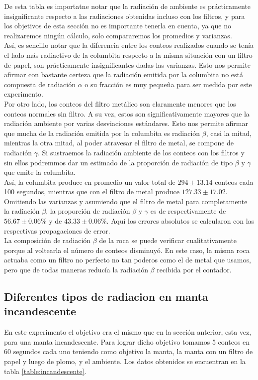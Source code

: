 \documentclass[%
 reprint,
 amsmath,amssymb,
 aps,
]{revtex4-1}
\begin{document}
De esta tabla es importatne notar que la radiación de ambiente es prácticamente insignificante respecto a las radiaciones obtenidas incluso con los filtros, y para los objetivos de esta sección no es importante tenerla en cuenta, ya que no realizaremos ningún cálculo, solo compararemos los promedios y varianzas.\\

Así, es sencillo notar que la diferencia entre los conteos realizados cuando se tenía el lado más radiactivo de la columbita respecto a la misma situación con un filtro de papel, son prácticamente insignificantes dadas las varianzas. Esto nos permite afirmar con bastante certeza que la radiación emitida por la columbita no está compuesta de radiación $\alpha$ o su fracción es muy pequeña para ser medida por este experimento. \\

Por otro lado, los conteos del filtro metálico son claramente menores que los conteos normales sin filtro. A su vez, estos son significativamente mayores que la radiación ambiente por varias desviaciones estándares. Esto nos permite afirmar que mucha de la radiación emitida por la columbita es radiación $\beta$, casi la mitad, mientras la otra mitad, al poder atravesar el filtro de metal, se compone de radiación $\gamma$. Si sustraemos la radiación ambiente de los conteos con los filtros y sin ellos podremmos dar un estimado de la proporción de radiación de tipo $\beta$ y $\gamma$ que emite la columbita.\\

Así, la columbita produce en promedio un valor total de $294 \pm 13.14$ conteos cada 100 segundos, mientras que con el filtro de metal produce $127.33 \pm 17.02$. Omitiendo las varianzas y asumiendo que el filtro de metal para completamente la radiación $\beta$, la proporción de radiación $\beta$ y $\gamma$ es de respectivamente de $56.67 \pm 0.06\%$  y de $43.33 \pm 0.06\%$. Aquí los errores absolutos se calcularon con las respectivas propagaciones de error.\\

La composición de radiación $\beta$ de la roca se puede verificar cualitativamente porque al voltearla el número de conteos disminuyó. En este caso, la misma roca actuaba como un filtro no perfecto no tan poderos como el de metal que usamos, pero que de todas maneras reducía la radiación $\beta$ recibida por el contador.\\

\subsection{\label{sec:level2}Diferentes tipos de radiacion en manta incandescente}
En este experimento el objetivo era el mismo que en la sección anterior, esta vez, para una manta incandescente. Para lograr dicho objetivo tomamos 5 conteos en 60 segundos cada uno teniendo como objetivo la manta, la manta con un filtro de papel y luego de plomo, y el ambiente. Los datos obtenidos se encuentran en la tabla \ref{table:incandescente}.\\
\end{document}
